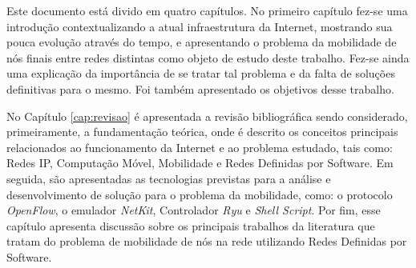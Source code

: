 \documentclass[	12pt, Times, openright, twoside, a4paper, english, brazil]{abntex2}
\begin{document}
Este documento está divido em quatro capítulos. No primeiro capítulo fez-se uma introdução contextualizando a atual infraestrutura da Internet, mostrando sua pouca evolução através do tempo, e apresentando o problema da mobilidade de nós finais entre redes distintas como objeto de estudo deste trabalho. Fez-se ainda uma explicação da importância de se tratar tal problema e da falta de soluções definitivas para o mesmo. Foi também apresentado os objetivos desse trabalho.



No Capítulo \ref{cap:revisao} é apresentada a revisão bibliográfica sendo considerado, primeiramente, a fundamentação teórica, onde é descrito os conceitos principais relacionados ao funcionamento da Internet e ao problema estudado, tais como: Redes IP, Computação Móvel, Mobilidade e Redes Definidas por Software. Em seguida, são apresentadas as tecnologias previstas para a análise e desenvolvimento de solução para o problema da mobilidade, como: o protocolo \textit{OpenFlow}, o emulador \textit{NetKit}, Controlador \textit{Ryu} e \textit{Shell Script}. Por fim, esse capítulo apresenta discussão sobre os principais trabalhos da literatura que tratam do problema de mobilidade de nós na rede utilizando Redes Definidas por Software.  

\end{document}
